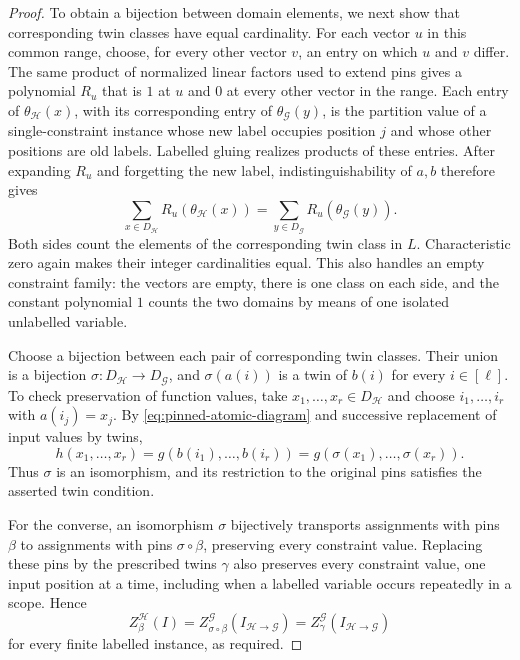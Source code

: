 \documentclass[11pt,letterpaper,onecolumn]{article}
\theoremstyle{plain}
\theoremstyle{definition}
\theoremstyle{remark}
\begin{document}
\begin{proof}
To obtain a bijection between domain elements, we next show that
corresponding twin classes have equal cardinality.
For each vector $u$ in this common range, choose, for every
other vector $v$, an entry on which $u$ and $v$ differ.  The same
product of normalized linear factors used to extend pins gives a polynomial
$R_u$ that is $1$ at $u$ and $0$ at every other vector in the range.
Each entry of $\theta_{\mathcal H}(x)$, with its corresponding entry of
$\theta_{\mathcal G}(y)$, is the partition value of a single-constraint instance
whose new label occupies position $j$ and whose other positions are old
labels.  Labelled gluing realizes products of these entries.  After
expanding $R_u$ and forgetting the new label, indistinguishability of
$a,b$ therefore gives
\[
  \sum_{x\in D_{\mathcal H}}R_u(\theta_{\mathcal H}(x))
  =\sum_{y\in D_{\mathcal G}}R_u(\theta_{\mathcal G}(y)).
\]
Both sides count the elements of the corresponding twin class in $L$.
Characteristic zero again makes their integer cardinalities equal.  This
also handles an empty constraint family: the vectors are empty,
there is one class on each side, and the constant polynomial $1$ counts
the two domains by means of one isolated unlabelled variable.

Choose a bijection between each pair of corresponding twin classes.
Their union is a bijection $\sigma:D_{\mathcal H}\to D_{\mathcal G}$, and
$\sigma(a(i))$ is a twin of $b(i)$ for every $i\in[\ell]$.
To check preservation of function values, take $x_1,\ldots,x_r\in D_{\mathcal H}$ and choose
$i_1,\ldots,i_r$ with $a(i_j)=x_j$.  By
\eqref{eq:pinned-atomic-diagram} and successive replacement of input values
by twins,
\[
  h(x_1,\ldots,x_r)
  =g(b(i_1),\ldots,b(i_r))
  =g(\sigma(x_1),\ldots,\sigma(x_r)).
\]
Thus $\sigma$ is an isomorphism, and its restriction to the original pins
satisfies the asserted twin condition.

For the converse, an isomorphism $\sigma$ bijectively transports assignments
with pins $\beta$ to assignments with pins $\sigma\circ\beta$, preserving
every constraint value.  Replacing these pins by the prescribed twins
$\gamma$ also preserves every constraint value, one input position at a time,
including when a labelled variable occurs repeatedly in a scope.  Hence
\[
  Z_\beta^{\mathcal H}(I)
  =Z_{\sigma\circ\beta}^{\mathcal G}(I_{\mathcal H\to\mathcal G})
  =Z_\gamma^{\mathcal G}(I_{\mathcal H\to\mathcal G})
\]
for every finite labelled instance, as required.
\end{proof}
\end{document}
